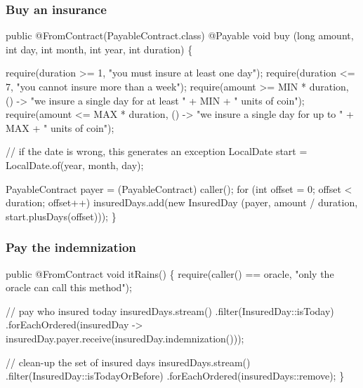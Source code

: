 \documentclass[11pt]{beamer}  %
\begin{document}
\begin{frame}[fragile]\frametitle{Buy an insurance}

{\scriptsize\begin{semiverbatim}
public {\color{violet}@FromContract(PayableContract.class)} {\color{airforceblue}@Payable} void buy
    ({\color{airforceblue}long amount}, int day, int month, int year, int duration) \{

  {\color{armygreen}require(duration >= 1, "you must insure at least one day");
  require(duration <= 7, "you cannot insure more than a week");
  require(amount >= MIN * duration,
    () -> "we insure a single day for at least " + MIN + " units of coin");
  require(amount <= MAX * duration,
    () -> "we insure a single day for up to " + MAX + " units of coin");}

  // if the date is wrong, this generates an exception
  LocalDate start = LocalDate.of(year, month, day);

  PayableContract payer = (PayableContract) {\color{violet}caller()};
  for (int offset = 0; offset < duration; offset++)
    insuredDays.add(new InsuredDay
                    (payer, amount / duration, start.plusDays(offset)));
\}
\end{semiverbatim}}

\end{frame}

\begin{frame}[fragile]\frametitle{Pay the indemnization}

{\scriptsize\begin{semiverbatim}
public {\color{violet}@FromContract} void itRains() \{
  {\color{armygreen}require({\color{violet}caller()} == oracle, "only the oracle can call this method");}

  {\color{red}// pay who insured today}
  insuredDays.stream()
    .filter(InsuredDay::isToday)
    .forEachOrdered(insuredDay ->
          insuredDay.payer.{\color{blue}receive}(insuredDay.indemnization()));

  {\color{red}// clean-up the set of insured days}
  insuredDays.stream()
    .filter(InsuredDay::isTodayOrBefore)
    .forEachOrdered(insuredDays::remove);
\}
\end{semiverbatim}}

\end{frame}
\end{document}
